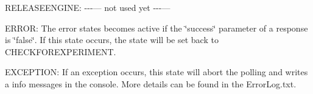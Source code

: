 \begin{DoxyParagraph}{}
R\+E\+L\+E\+A\+S\+E\+E\+N\+G\+I\+N\+E\+: -\/-\/-\/--- not used yet -\/-\/-\/---
\end{DoxyParagraph}
\begin{DoxyParagraph}{}
E\+R\+R\+O\+R\+: The error states becomes active if the \char`\"{}success\char`\"{} parameter of a response is \char`\"{}false\char`\"{}. If this state occurs, the state will be set back to C\+H\+E\+C\+K\+F\+O\+R\+E\+X\+P\+E\+R\+I\+M\+E\+N\+T.
\end{DoxyParagraph}
\begin{DoxyParagraph}{}
E\+X\+C\+E\+P\+T\+I\+O\+N\+: If an exception occurs, this state will abort the polling and writes a info messages in the console. More details can be found in the Error\+Log.\+txt. 
\end{DoxyParagraph}
